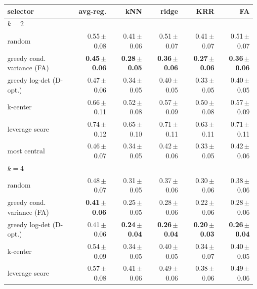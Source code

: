 \begin{tabular}{lrrrrr}
\toprule
selector & avg-reg. & kNN & ridge & KRR & FA \\
\midrule
\multicolumn{6}{l}{\emph{$k=2$}} \\
random & 0.55\,{\scriptsize$\pm$0.08} & 0.41\,{\scriptsize$\pm$0.06} & 0.51\,{\scriptsize$\pm$0.07} & 0.41\,{\scriptsize$\pm$0.07} & 0.51\,{\scriptsize$\pm$0.07} \\
greedy cond. variance (FA) & \textbf{0.45\,{\scriptsize$\pm$0.06}} & \textbf{0.28\,{\scriptsize$\pm$0.05}} & \textbf{0.36\,{\scriptsize$\pm$0.06}} & \textbf{0.27\,{\scriptsize$\pm$0.06}} & \textbf{0.36\,{\scriptsize$\pm$0.06}} \\
greedy log-det (D-opt.) & 0.47\,{\scriptsize$\pm$0.06} & 0.34\,{\scriptsize$\pm$0.05} & 0.40\,{\scriptsize$\pm$0.05} & 0.33\,{\scriptsize$\pm$0.05} & 0.40\,{\scriptsize$\pm$0.05} \\
k-center & 0.66\,{\scriptsize$\pm$0.11} & 0.52\,{\scriptsize$\pm$0.08} & 0.57\,{\scriptsize$\pm$0.09} & 0.50\,{\scriptsize$\pm$0.08} & 0.57\,{\scriptsize$\pm$0.09} \\
leverage score & 0.74\,{\scriptsize$\pm$0.12} & 0.65\,{\scriptsize$\pm$0.10} & 0.71\,{\scriptsize$\pm$0.11} & 0.63\,{\scriptsize$\pm$0.11} & 0.71\,{\scriptsize$\pm$0.11} \\
most central & 0.46\,{\scriptsize$\pm$0.07} & 0.34\,{\scriptsize$\pm$0.05} & 0.42\,{\scriptsize$\pm$0.06} & 0.33\,{\scriptsize$\pm$0.05} & 0.42\,{\scriptsize$\pm$0.06} \\
\multicolumn{6}{l}{\emph{$k=4$}} \\
random & 0.48\,{\scriptsize$\pm$0.07} & 0.31\,{\scriptsize$\pm$0.05} & 0.37\,{\scriptsize$\pm$0.06} & 0.30\,{\scriptsize$\pm$0.06} & 0.38\,{\scriptsize$\pm$0.06} \\
greedy cond. variance (FA) & \textbf{0.41\,{\scriptsize$\pm$0.06}} & 0.25\,{\scriptsize$\pm$0.05} & 0.28\,{\scriptsize$\pm$0.06} & 0.22\,{\scriptsize$\pm$0.06} & 0.28\,{\scriptsize$\pm$0.06} \\
greedy log-det (D-opt.) & 0.41\,{\scriptsize$\pm$0.06} & \textbf{0.24\,{\scriptsize$\pm$0.04}} & \textbf{0.26\,{\scriptsize$\pm$0.04}} & \textbf{0.20\,{\scriptsize$\pm$0.03}} & \textbf{0.26\,{\scriptsize$\pm$0.04}} \\
k-center & 0.54\,{\scriptsize$\pm$0.09} & 0.34\,{\scriptsize$\pm$0.05} & 0.40\,{\scriptsize$\pm$0.05} & 0.34\,{\scriptsize$\pm$0.07} & 0.40\,{\scriptsize$\pm$0.05} \\
leverage score & 0.57\,{\scriptsize$\pm$0.08} & 0.41\,{\scriptsize$\pm$0.06} & 0.49\,{\scriptsize$\pm$0.06} & 0.38\,{\scriptsize$\pm$0.06} & 0.49\,{\scriptsize$\pm$0.06} \\

\end{tabular}
